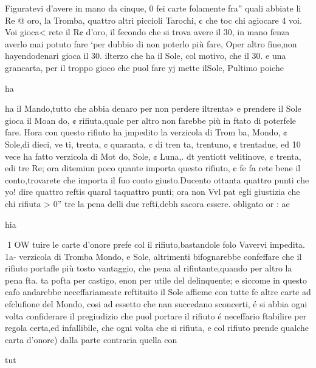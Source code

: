 \documentclass[12pt,a6paper]{article}
\begin{document}
 Figuratevi d’avere in mano
da cinque, 0 fei carte folamente fra” quali abbiate li Re @
oro, la Tromba, quattro altri piccioli Tarochi, ¢ che toc
chi agiocare 4 voi. Voi gioca<
rete il R¢ d’oro, il fecondo che
si trova avere il 30, in mano
fenza averlo mai potuto fare
‘per dubbio di non poterlo più
fare, Oper altro fine,non hayendodenari gioca il 30. ilterzo
che ha il Sole, col motivo, che
il 30. e una grancarta, per il
troppo gioco che puol fare yj
mette ilSole, Pultimo poiche

ha

 

 

 

 
 

 

 

 

ha il Mando,tutto che abbia denaro per non perdere iltrenta»
e prendere il Sole gioca il Moan
do, ¢ rifiuta,quale per altro non
farebbe più in ftato di poterfele
fare. Hora con questo rifiuto ha
jmpedito la verzicola di Trom
ba, Mondo, ¢ Sole,di dieci, ve
ti, trenta, ¢ quaranta, ¢ di tren
ta, trentuno, ¢ trentadue, ed 10
vece ha fatto verzicola di Mot
do, Sole, ¢ Luna,. dt yentiott
velitinove, ¢ trenta, edi tre
Re; ora ditemiun poco quante
importa questo rifiuto, ¢ fe fa
rete bene il conto,trovarete che
importa il fuo conto giusto.Ducento ottanta quattro punti che
yo! dire quattro reftis quaral
taquattro punti; ora non Vvl pat
egli giustizia che chi rifiuta > 0”
tre la pena delli due refti,debh
sacora essere. obligato or :
ae

hia

 
1 OW
tuire le carte d’onore prefe col
il rifiuto,bastandole folo Vavervi impedita. 1a- verzicola di
Tromba Mondo, e Sole, altrimenti bifognarebbe confeffare
che il rifiuto portafle più tosto
vantaggio, che pena al rifiutante,quando per altro la pena fta.
ta pofta per castigo, enon per
utile del delinquente; e siccome
in questo cafo andarebbe neceffariameate reftituito il Sole affieme con tutte fe altre carte ad
efclufione del Mondo, cosi ad
essetto che nan succedano sconcerti, é si abbia ogni volta
confiderare il pregiudizio che
puol portare il rifiuto é neceffario ftabilire per regola certa,ed infallibile, che ogni volta
che si rifiuta, e col rifiuto
prende qualche carta d’onore)
dalla parte contraria quella con

tut
 

 

 
 
\end{document}
